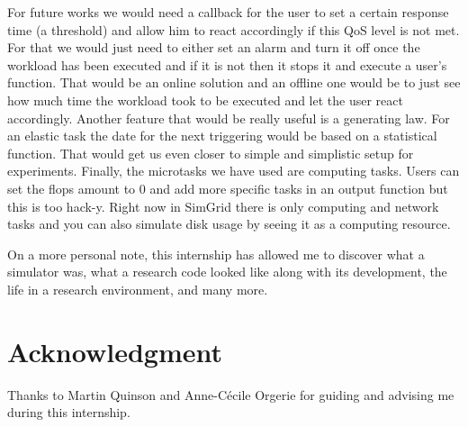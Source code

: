 \documentclass[a4paper, onecolumn, 11pt]{article}
\begin{document}
For future works we would need a callback for the user to set a certain 
response time (a threshold) and allow him to react accordingly if this QoS level
is not met. For that we would just need to either set an alarm and turn it off
once the workload has been executed and if it is not then it stops it and
execute a user's function. That would be an online solution and an offline one
would be to just see how much time the workload took to be executed and let the
user react accordingly. Another feature that would be really useful is a
generating law. For an elastic task the date for the next triggering would be
based on a statistical function. That would get us even closer to simple and
simplistic setup for experiments. Finally, the microtasks we have used are
computing tasks. Users can set the flops amount to 0 and add more specific tasks
in an output function but this is too hack-y. Right now in SimGrid there is only
computing and network tasks and you can also simulate disk usage by seeing it as
a computing resource.

On a more personal note, this internship has allowed me to discover what a 
simulator was, what a research code looked like along with its development, the 
life in a research environment, and many more.


\section*{Acknowledgment}
Thanks to Martin Quinson and Anne-C\'ecile Orgerie for guiding and advising me 
during this internship.




\end{document}
